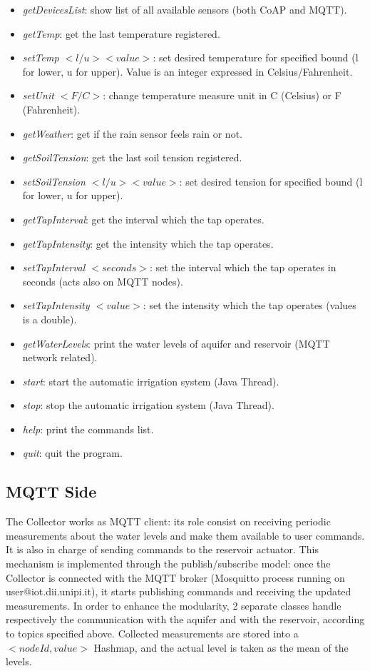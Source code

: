 \begin{itemize}
	\item \textit{getDevicesList}: show list of all available sensors (both CoAP and MQTT).
	\item \textit{getTemp}: get the last temperature registered.
	\item \textit{setTemp $<l/u> <value>$}: set desired temperature for specified bound (l for lower, u for upper). Value is an integer expressed in Celsius/Fahrenheit.
	\item \textit{setUnit $<F/C>$}: change temperature measure unit in C (Celsius) or F (Fahrenheit).
	\item \textit{getWeather}: get if the rain sensor feels rain or not.
	\item \textit{getSoilTension}: get the last soil tension registered.
	\item \textit{setSoilTension $<l/u> <value>$}: set desired tension for specified bound (l for lower, u for upper).
	\item \textit{getTapInterval}: get the interval which the tap operates.
	\item \textit{getTapIntensity}: get the intensity which the tap operates.
	\item \textit{setTapInterval $<seconds>$}: set the interval which the tap operates in seconds (acts also on MQTT nodes).
	\item \textit{setTapIntensity $<value>$}: set the intensity which the tap operates (values is a double).
	\item \textit{getWaterLevels}: print the water levels of aquifer and reservoir (MQTT network related).
	\item \textit{start}: start the automatic irrigation system (Java Thread).
	\item \textit{stop}: stop the automatic irrigation system (Java Thread).
	\item \textit{help}: print the commands list.
	\item \textit{quit}: quit the program.
\end{itemize}




\subsection{MQTT Side}
The Collector works as MQTT client: its role consist on receiving periodic measurements about the water levels and make them available to user commands. It is also in charge of sending commands to the reservoir actuator. This mechanism is implemented through the publish/subscribe model: once the Collector is connected with the MQTT broker (Mosquitto process running on user@iot.dii.unipi.it), it starts publishing commands and receiving the updated measurements.
In order to enhance the modularity, 2 separate classes handle respectively the communication with the aquifer and  with the reservoir, according to topics specified above. Collected measurements are stored into a $<nodeId, value>$ Hashmap, and the actual level is taken as the mean of the levels.

